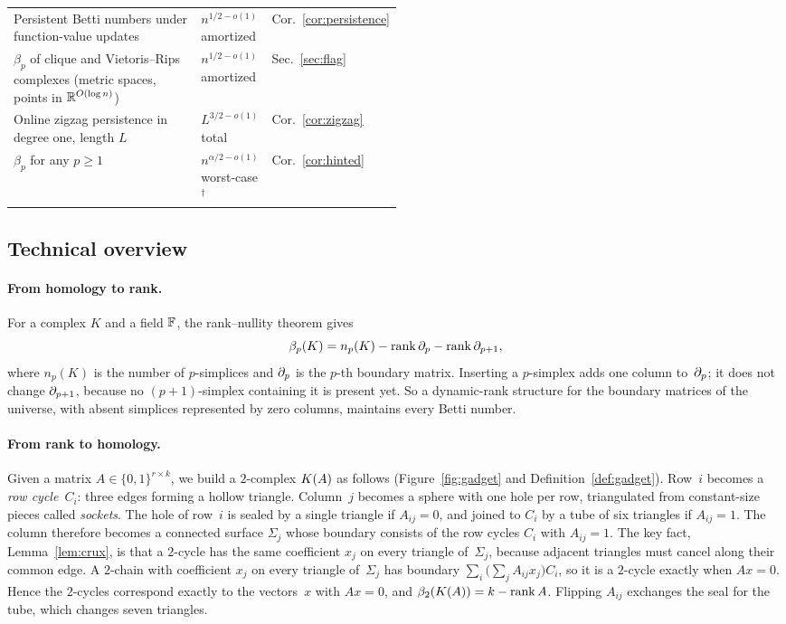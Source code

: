 \begin{table}[tb]
\begin{tabular}{@{}>{\raggedright\arraybackslash}p{0.5\linewidth}ll@{}}
Persistent Betti numbers under function-value updates & $n^{1/2-o(1)}$ amortized & Cor.~\ref{cor:persistence} \\
$\beta_p$ of clique and Vietoris--Rips complexes (metric spaces, points in $\mathbb{R}^{O(\log n)}$) & $n^{1/2-o(1)}$ amortized & Sec.~\ref{sec:flag} \\
Online zigzag persistence in degree one, length $L$ & $L^{3/2-o(1)}$ total & Cor.~\ref{cor:zigzag} \\
$\beta_p$ for any $p\ge1$ & $n^{\alpha/2-o(1)}$ worst-case${}^{\dagger}$ & Cor.~\ref{cor:hinted} \\
\bottomrule
\end{tabular}
\end{table}

\subsection{Technical overview}\label{sec:overview}


\paragraph{From homology to rank.}
For a complex $K$ and a field $\mathbb{F}$, the rank--nullity theorem gives
\[
  \beta_p(K)=n_p(K)-\operatorname{rank}\partial_p-\operatorname{rank}\partial_{p+1},
\]
where $n_p(K)$ is the number of $p$-simplices and $\partial_p$ is the $p$-th boundary matrix.
Inserting a $p$-simplex adds one column to~$\partial_p$; it does not change $\partial_{p+1}$, because no $(p+1)$-simplex containing it is present yet.
So a dynamic-rank structure for the boundary matrices of the universe, with absent simplices represented by zero columns, maintains every Betti number.

\paragraph{From rank to homology.}
Given a matrix $A\in\{0,1\}^{r\times k}$, we build a $2$-complex $K(A)$ as follows (Figure~\ref{fig:gadget} and Definition~\ref{def:gadget}).
Row~$i$ becomes a \emph{row cycle}~$C_i$: three edges forming a hollow triangle.
Column~$j$ becomes a sphere with one hole per row, triangulated from constant-size pieces called \emph{sockets}.
The hole of row~$i$ is sealed by a single triangle if $A_{ij}=0$, and joined to $C_i$ by a tube of six triangles if $A_{ij}=1$.
The column therefore becomes a connected surface $\Sigma_j$ whose boundary consists of the row cycles $C_i$ with $A_{ij}=1$.
The key fact, Lemma~\ref{lem:crux}, is that a $2$-cycle has the same coefficient $x_j$ on every triangle of~$\Sigma_j$, because adjacent triangles must cancel along their common edge.
A $2$-chain with coefficient $x_j$ on every triangle of~$\Sigma_j$ has boundary $\sum_i\bigl(\sum_jA_{ij}x_j\bigr)C_i$, so it is a $2$-cycle exactly when $Ax=0$.
Hence the $2$-cycles correspond exactly to the vectors~$x$ with $Ax=0$, and $\beta_2(K(A))=k-\operatorname{rank} A$.
Flipping $A_{ij}$ exchanges the seal for the tube, which changes seven triangles.

